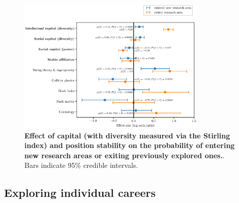 \documentclass{article}
\begin{document}
\begin{figure}[H]
    \centering
    \includegraphics[width=0.8\textwidth]{plots/exited_score_effects_stirling_magnitude.eps}
    \caption{\textbf{Effect of capital (with diversity measured via the Stirling index) and position stability on the probability of entering new research areas or exiting previously explored ones.}. Bars indicate 95\% credible intervals.}
    \label{fig:diversification_score_stirling}
\end{figure}



\subsection{\label{appendix:cases}Exploring individual careers}
\end{document}
